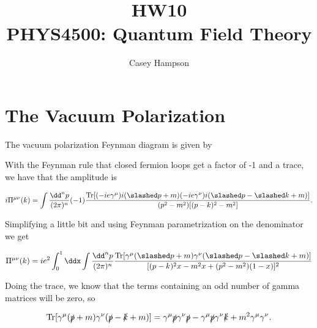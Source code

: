 \documentclass[titlepage]{article}
\title{HW10 \\[5pt] PHYS4500: Quantum Field Theory}
\author{Casey Hampson}
\begin{document}
\maketitle
\pagebreak



\section*{The Vacuum Polarization}

The vacuum polarization Feynman diagram is given by

\begin{center}
\end{center}

With the Feynman rule that closed fermion loops get a factor of -1 and a trace, we have that the amplitude is

\begin{equation}
i\Pi^{\mu\nu}(k) = \int \frac{\dd^n p}{(2\pi)^n} (-1) \frac{\Tr[(-ie\gamma^{\mu})i(\psl + m)(-ie\gamma^{\nu})i(\psl - \ksl + m)]}{(p^2-m^2)[(p-k)^2-m^2]}.
\end{equation}

Simplifying a little bit and using Feynman parametrization on the denominator we get

\begin{equation}
    \Pi^{\mu\nu}(k) = ie^2 \int_0^1 \ddx \int \frac{\dd^n p}{(2\pi)^n} \frac{\Tr[\gamma^{\mu}(\psl + m)\gamma^{\nu}(\psl - \ksl + m)]}{[(p-k)^2x - m^2x + (p^2 - m^2)(1-x)]^2}
\end{equation}


Doing the trace, we know that the terms containing an odd number of gamma matrices will be zero, so

\begin{equation}
    \mathrm{Tr}[\gamma^{\mu}(\slashed{p} + m)\gamma^{\nu}(\slashed{p} - \slashed{k} + m)] = \gamma^{\mu}\slashed{p}\gamma^{\nu}\slashed{p} - \gamma^{\mu}\slashed{p}\gamma^{\nu}\slashed{k} + m^2\gamma^{\mu}\gamma^{\nu}.
\end{equation}
\end{document}
